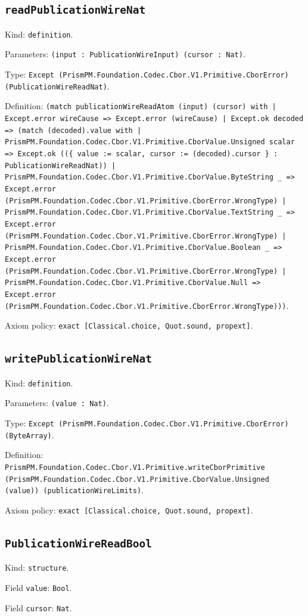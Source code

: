 \documentclass[11pt]{article}
\begin{document}
\subsection*{\texttt{readPublicationWireNat}}
\noindent Kind: \texttt{definition}.\par
\noindent Parameters: \texttt{(input : PublicationWireInput) (cursor : Nat)}.\par
\noindent Type: \texttt{Except (PrismPM.Foundation.Codec.Cbor.V1.Primitive.CborError) (PublicationWireReadNat)}.\par
\noindent Definition: \texttt{(match publicationWireReadAtom (input) (cursor) with | Except.error wireCause => Except.error (wireCause) | Except.ok decoded => (match (decoded).value with | PrismPM.Foundation.Codec.Cbor.V1.Primitive.CborValue.Unsigned scalar => Except.ok ((\{ value := scalar, cursor := (decoded).cursor \} : PublicationWireReadNat)) | PrismPM.Foundation.Codec.Cbor.V1.Primitive.CborValue.ByteString \_ => Except.error (PrismPM.Foundation.Codec.Cbor.V1.Primitive.CborError.WrongType) | PrismPM.Foundation.Codec.Cbor.V1.Primitive.CborValue.TextString \_ => Except.error (PrismPM.Foundation.Codec.Cbor.V1.Primitive.CborError.WrongType) | PrismPM.Foundation.Codec.Cbor.V1.Primitive.CborValue.Boolean \_ => Except.error (PrismPM.Foundation.Codec.Cbor.V1.Primitive.CborError.WrongType) | PrismPM.Foundation.Codec.Cbor.V1.Primitive.CborValue.Null => Except.error (PrismPM.Foundation.Codec.Cbor.V1.Primitive.CborError.WrongType)))}.\par
\noindent Axiom policy: \texttt{exact [Classical.choice, Quot.sound, propext]}.\par
\subsection*{\texttt{writePublicationWireNat}}
\noindent Kind: \texttt{definition}.\par
\noindent Parameters: \texttt{(value : Nat)}.\par
\noindent Type: \texttt{Except (PrismPM.Foundation.Codec.Cbor.V1.Primitive.CborError) (ByteArray)}.\par
\noindent Definition: \texttt{PrismPM.Foundation.Codec.Cbor.V1.Primitive.writeCborPrimitive (PrismPM.Foundation.Codec.Cbor.V1.Primitive.CborValue.Unsigned (value)) (publicationWireLimits)}.\par
\noindent Axiom policy: \texttt{exact [Classical.choice, Quot.sound, propext]}.\par
\subsection*{\texttt{PublicationWireReadBool}}
\noindent Kind: \texttt{structure}.\par
\noindent Field \texttt{value}: \texttt{Bool}.\par
\noindent Field \texttt{cursor}: \texttt{Nat}.\par
\end{document}
